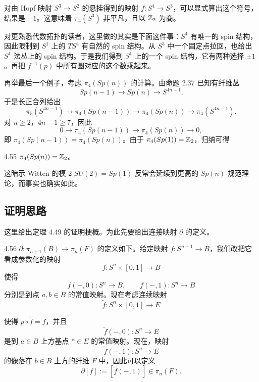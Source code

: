 对由 Hopf 映射 $S^3\to S^2$ 的悬挂得到的映射 $f:S^4\to S^3$，可以显式算出这个符号，结果是 $-1$。这意味着 $\pi_4(S^3)$ 非平凡，且以 $\mathbb{Z}_2$ 为商。

对更熟悉代数拓扑的读者，这里做的其实是下面这件事：$S^4$ 有唯一的 spin 结构，因此限制到 $S^1$ 上的 $TS^4$ 有自然的 spin 结构。从 $S^3$ 中一个固定点拉回，也给出 $S^1$ 法丛上的 spin 结构。于是我们得到 $S^1$ 上的一个 spin 结构，它有两种选择 $\pm 1$。再把 $f^{-1}(p)$ 中所有圆对应的这个数乘起来。\qedmark

再举最后一个例子，考虑 $\pi_4(Sp(n))$ 的计算。由命题 2.37 已知有纤维丛
\begin{equation}
Sp(n-1)\to Sp(n)\to S^{4n-1}.
\tag{4.39}
\end{equation}
于是长正合列给出
\begin{equation}
\pi_5(S^{4n-1})\to\pi_4(Sp(n-1))\to\pi_4(Sp(n))\to\pi_4(S^{4n-1}).
\tag{4.40}
\end{equation}
对 $n\ge 2$，$4n-1\ge 7$，因此
\begin{equation}
0\to\pi_4(Sp(n-1))\to\pi_4(Sp(n))\to 0,
\tag{4.41}
\end{equation}
即 $\pi_4(Sp(n-1))=\pi_4(Sp(n))$。由于 $\pi_4(Sp(1))=\mathbb{Z}_2$，归纳可得

\begin{example}{4.55}
$\pi_4(Sp(n))=\mathbb{Z}_2$。
\end{example}

这暗示 Witten 的模 2 $SU(2)=Sp(1)$ 反常会延续到更高的 $Sp(n)$ 规范理论，而事实也确实如此。

\subsection{证明思路}

这里给出定理 4.49 的证明梗概。为此先要给出连接映射 $\partial$ 的定义。

\begin{definition}{4.56}
$\partial:\pi_{n+1}(B)\to\pi_n(F)$ 的定义如下。给定映射 $f:S^{n+1}\to B$，我们改把它看成参数化的映射
\begin{equation}
f:S^n\times[0,1]\to B
\tag{4.42}
\end{equation}
使得
\begin{equation}
f(-,0):S^n\to B,\qquad f(-,1):S^n\to B
\tag{4.43}
\end{equation}
分别是到点 $a,b\in B$ 的常值映射。现在考虑连续映射
\begin{equation}
\tilde{f}:S^n\times[0,1]\to E
\tag{4.44}
\end{equation}

使得 $p\circ\tilde f=f$，并且
\begin{equation}
\tilde{f}(-,0):S^n\to E
\tag{4.45}
\end{equation}
是到 $a\in B$ 上方基点 $*\in E$ 的常值映射。现在，映射
\begin{equation}
\tilde{f}(-,1):S^n\to E
\tag{4.46}
\end{equation}
的像落在 $b\in B$ 上方的纤维 $F$ 中，因此可以定义
\begin{equation}
\partial[f]:=[\tilde{f}(-,1)]\in\pi_n(F).
\tag{4.47}
\end{equation}
\end{definition}

